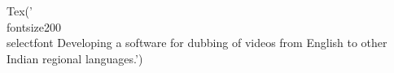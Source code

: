 \documentclass[preview]{standalone}
\begin{document}
\begin{flushleft}
Tex('\\fontsize{20}{0}\\selectfont Developing a software for dubbing of videos from English to other Indian regional languages.')
\end{flushleft}
\end{document}
